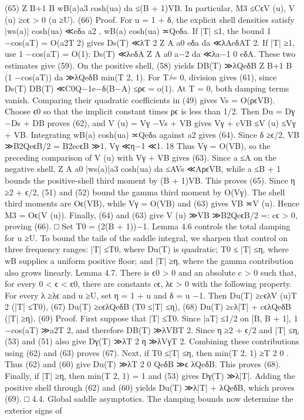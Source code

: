(65)
Z B+1
B
wB(a)a3 cosh(ua) da ≤(B + 1)VB.
In particular,
M3 ≤CϵV (u),
V (u) ≥cϵ > 0
(u ≥U).
(66)
Proof. For u = 1 + δ, the explicit shell densities satisfy
|ws(a)| cosh(ua) ≪eδa
a2 ,
wB(a) cosh(ua) ≍Qeδa.
If |T| ≤1, the bound 1 −cos(aT) = O(a2T 2) gives
Ds(T) ≪λT 2
Z A
a0
eδa da ≪λAeδAT 2.
If |T| ≥1, use 1 −cos(aT) = O(1):
Ds(T) ≪λeδA
Z A
a0
a−2 da ≪λa−1
0 eδA.
These two estimates give (59). On the positive shell, (58) yields
DB(T) ≫λQeδB
Z B+1
B
(1 −cos(aT)) da ≫λQeδB min(T 2, 1).
For T ̸= 0, division gives (61), since
Ds(T)
DB(T) ≪C0Q−1e−δ(B−A) ≤ρϵ = o(1).
At T = 0, both damping terms vanish. Comparing their quadratic coeﬃcients in (49) gives
Vs = O(ρϵVB). Choose ϵ0 so that the implicit constant times ρϵ is less than 1/2. Then Du =
Dγ −Ds + DB proves (62), and V (u) = Vγ −Vs + VB gives
Vγ + cVB ≤V (u) ≤Vγ + VB.
Integrating wB(a) cosh(ua) ≍Qeδa against a2 gives (64). Since δ ≥ϵ/2,
VB ≫B2QeϵB/2 = B2ecϵB ≫1,
Vγ ≪η−1 ≪1.
18
Thus Vγ = O(VB), so the preceding comparison of V (u) with Vγ + VB gives (63). Since a ≤A
on the negative shell,
Z A
a0
|ws(a)|a3 cosh(ua) da ≤AVs ≪AρϵVB,
while a ≤B + 1 bounds the positive-shell third moment by (B + 1)VB. This proves (65).
Since η ≥2 + ϵ/2, (51) and (52) bound the gamma third moment by O(Vγ). The shell third
moments are Oϵ(VB), while Vγ = O(VB) and (63) gives VB ≍V (u). Hence M3 = Oϵ(V (u)).
Finally, (64) and (63) give V (u) ≫VB ≫B2QeϵB/2 =: cϵ > 0, proving (66).
□
Set T0 = (2(B + 1))−1.
Lemma 4.6 controls the total damping for u ≥U. To bound the tails of the saddle integral,
we sharpen that control on three frequency ranges: |T| ≤T0, where Du(T) is quadratic; T0 ≤
|T| ≤η, where wB supplies a uniform positive ﬂoor; and |T| ≥η, where the gamma contribution
also grows linearly.
Lemma 4.7. There is ϵ0 > 0 and an absolute c > 0 such that, for every 0 < ϵ < ϵ0, there are
constants cϵ, λϵ > 0 with the following property. For every λ ≥λϵ and u ≥U, set η = 1 + u and
δ = u −1. Then
Du(T) ≥cϵλV (u)T 2
(|T| ≤T0),
(67)
Du(T) ≥cϵλQeδB
(T0 ≤|T| ≤η),
(68)
Du(T) ≥cλ|T| + cϵλQeδB
(|T| ≥η).
(69)
Proof. First suppose that |T| ≤T0. Since |aT| ≤1/2 on [B, B + 1], 1 −cos(aT) ≫a2T 2, and
therefore
DB(T) ≫λVBT 2.
Since η ≥2 + ϵ/2 and |T| ≤η, (53) and (51) also give
Dγ(T) ≫λT 2
η
≫λVγT 2.
Combining these contributions using (62) and (63) proves (67).
Next, if T0 ≤|T| ≤η, then min(T 2, 1) ≥T 2
0 . Thus (62) and (60) give
Du(T) ≫λT 2
0 QeδB ≫ϵ λQeδB.
This proves (68).
Finally, if |T| ≥η, then min(T 2, 1) = 1 and (53) gives Dγ(T) ≫λ|T|. Adding the positive
shell through (62) and (60) yields
Du(T) ≫λ|T| + λQeδB,
which proves (69).
□
4.4. Global saddle asymptotics. The damping bounds now determine the exterior signs of
